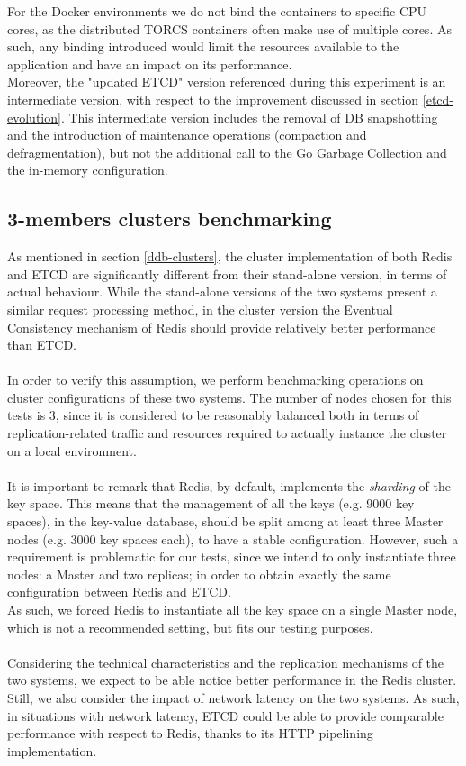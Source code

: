 For the Docker environments we do not bind the containers to specific CPU cores, as the distributed TORCS containers often make use of multiple cores. As such, any binding introduced would limit the resources available to the application and have an impact on its performance. \\
Moreover, the "updated ETCD" version referenced during this experiment is an intermediate version, with respect to the improvement discussed in section \ref{etcd-evolution}. This intermediate version includes the removal of DB snapshotting and the introduction of maintenance operations (compaction and defragmentation), but not the additional call to the Go Garbage Collection and the in-memory configuration.

\subsection{3-members clusters benchmarking}\label{benchmarking}
As mentioned in section \ref{ddb-clusters}, the cluster implementation of both Redis and ETCD are significantly different from their stand-alone version, in terms of actual behaviour. While the stand-alone versions of the two systems present a similar request processing method, in the cluster version the Eventual Consistency mechanism of Redis should provide relatively better performance than ETCD. \\ \\
In order to verify this assumption, we perform benchmarking operations on cluster configurations of these two systems. The number of nodes chosen for this tests is 3, since it is considered to be reasonably balanced both in terms of replication-related traffic and resources required to actually instance the cluster on a local environment. \\ \\
It is important to remark that Redis, by default, implements the \textit{sharding} of the key space. This means that the management of all the keys (e.g. 9000 key spaces), in the key-value database, should be split among at least three Master nodes (e.g. 3000 key spaces each), to have a stable configuration. However, such a requirement is problematic for our tests, since we intend to only instantiate three nodes: a Master and two replicas; in order to obtain exactly the same configuration between Redis and ETCD. \\
As such, we forced Redis to instantiate all the key space on a single Master node, which is not a recommended setting, but fits our testing purposes. \\ \\
Considering the technical characteristics and the replication mechanisms of the two systems, we expect to be able notice better performance in the Redis cluster. Still, we also consider the impact of network latency on the two systems. As such, in situations with network latency, ETCD could be able to provide comparable performance with respect to Redis, thanks to its HTTP pipelining implementation.

